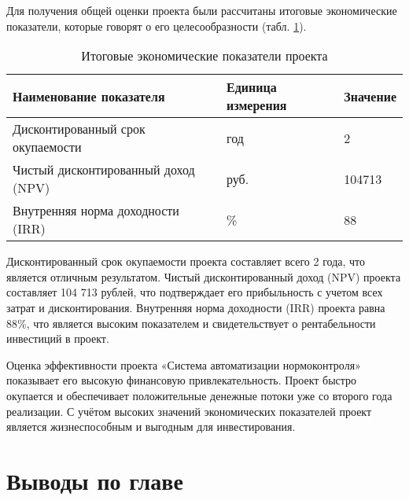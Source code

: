 \documentclass{report}
\begin{document}
Для получения общей оценки проекта были рассчитаны итоговые экономические показатели, которые говорят о его целесообразности (табл. \ref{table:table21}).

\renewcommand{\arraystretch}{1} 
\begin{table}[H]
    \centering   %
    \caption{Итоговые экономические показатели проекта}    %
    \begin{tabular}{|m{8.89cm}|m{4.4cm}|m{2.4cm}|}        %
    \hline   %
    \centering\arraybackslash Наименование показателя & \centering\arraybackslash Единица измерения & \centering\arraybackslash Значение \\ \hline
    Дисконтированный срок окупаемости & год & 2 \\ \hline
    Чистый дисконтированный доход (NPV) & руб. & 104713 \\ \hline
    Внутренняя норма доходности (IRR) & \% & 88 \\ \hline
    \end{tabular}
    \label{table:table21}
\end{table}


Дисконтированный срок окупаемости проекта составляет всего 2 года, что является отличным результатом. Чистый дисконтированный доход (NPV) проекта составляет 104 713 рублей, что подтверждает его прибыльность с учетом всех затрат и дисконтирования. Внутренняя норма доходности (IRR) проекта равна 88\%, что является высоким показателем и свидетельствует о рентабельности инвестиций в проект.

Оценка эффективности проекта «Система автоматизации нормоконтроля» показывает его высокую финансовую привлекательность. Проект быстро окупается и обеспечивает положительные денежные потоки уже со второго года реализации. С учётом высоких значений экономических показателей проект является жизнеспособным и выгодным для инвестирования.

\section*{Выводы по главе}
\end{document}

